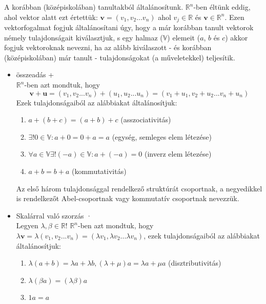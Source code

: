 \documentclass[12pt,a4paper]{scrartcl}
\providecommand{\tightlist}{%
  \setlength{\itemsep}{0pt}\setlength{\parskip}{0pt}}
\begin{document}
A korábban (középiskolában) tanultakból általánosítunk.
\({\mathbb{R}}^{n}\)-ben éltünk eddig, ahol vektor alatt ezt értettük:
\(\mathbf{v} = \left( {v_{1},v_{2}...v_{n}} \right)\) ahol
\(v_{j} \in {\mathbb{R}}\) és \(\mathbf{v} \in {\mathbb{R}}^{n}\). Ezen
vektorfogalmat fogjuk általánosítani úgy, hogy a már korábban tanult
vektorok némely tulajdonságait kiválasztjuk, s egy halmaz
(\(\mathbb{V}\)) elemeit (\(a\), \(b\) és \(c\)) akkor fogjuk
vektoroknak nevezni, ha az alább kiválaszott - és korábban
(középiskolában) már tanult - tulajdonságokat (a műveletekkel)
teljesítik.

\begin{itemize}
\tightlist
\item
  összeadás +\\
  \({\mathbb{R}}^{n}\)-ben azt mondtuk, hogy
  \[\mathbf{v} + \mathbf{u} = \left( {v_{1},v_{2}...v_{n}} \right) + \left( {u_{1},u_{2}...u_{n}} \right) = \left( {v_{1} + u_{1},v_{2} + u_{2}...v_{n} + u_{n}} \right)\]
  Ezek tulajdonságaiból az alábbiakat általánosítjuk:

  \begin{enumerate}
  \def\labelenumi{\arabic{enumi}.}
  \tightlist
  \item
    \(a + \left( {b + c} \right) = \left( {a + b} \right) + c\)
    (asszociativitás)
  \item
    \(\exists!0 \in {\mathbb{V}}:a + 0 = 0 + a = a\) (egység, semleges
    elem létezése)
  \item
    \(\forall a \in {\mathbb{V}}\exists!( - a) \in {\mathbb{V}}:a + ( - a) = 0\)
    (inverz elem létezése)
  \item
    \(a + b = b + a\) (kommutativitás)
  \end{enumerate}

  Az első három tulajdonsággal rendelkező struktúrát csoportnak, a
  negyedikkel is rendelkezőt Abel-csoportnak vagy kommutatív csoportnak
  nevezzük.
\item
  Skalárral való szorzás ·\\
  Legyen \(\lambda,\beta \in {\mathbb{R}}\)! \({\mathbb{R}}^{n}\)-ben
  azt mondtuk, hogy
  \(\lambda\mathbf{v} = \lambda\left( {v_{1},v_{2}...v_{n}} \right) = \left( {\lambda v_{1},\lambda v_{2}...\lambda v_{n}} \right)\),
  ezek tulajdonságaiból az alábbiakat általánosítjuk:

  \begin{enumerate}
  \def\labelenumi{\arabic{enumi}.}
  \tightlist
  \item
    \(\lambda\left( {a + b} \right) = \lambda a + \lambda b,\left( {\lambda + \mu} \right)a = \lambda a + \mu a\)
    (disztributivitás)
  \item
    \(\lambda\left( {\beta a} \right) = \left( {\lambda\beta} \right)a\)
  \item
    \(1a = a\)
  \end{enumerate}
\end{itemize}
\end{document}
